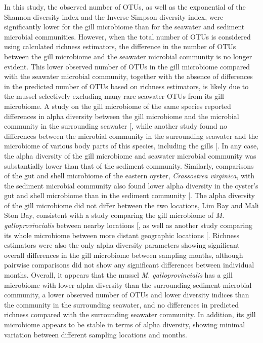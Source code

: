 \documentclass[
  12 pt,
]{article}
\begin{document}
In this study, the observed number of OTUs, as well as the exponential of the Shannon diversity index and the Inverse Simpson diversity index, were significantly lower for the gill microbiome than for the seawater and sediment microbial communities. However, when the total number of OTUs is considered using calculated richness estimators, the difference in the number of OTUs between the gill microbiome and the seawater microbial community is no longer evident. This lower observed number of OTUs in the gill microbiome compared with the seawater microbial community, together with the absence of differences in the predicted number of OTUs based on richness estimators, is likely due to the mussel selectively excluding many rare seawater OTUs from its gill microbiome. A study on the gill microbiome of the same species reported differences in alpha diversity between the gill microbiome and the microbial community in the surrounding seawater {[}\citeproc{ref-Zardinoni2024}{31}{]}, while another study found no differences between the microbial community in the surrounding seawater and the microbiome of various body parts of this species, including the gills {[}\citeproc{ref-Musella2020}{14}{]}. In any case, the alpha diversity of the gill microbiome and seawater microbial community was substantially lower than that of the sediment community. Similarly, comparisons of the gut and shell microbiome of the eastern oyster, \emph{Crassostrea virginica}, with the sediment microbial community also found lower alpha diversity in the oyster's gut and shell microbiome than in the sediment community {[}\citeproc{ref-Arfken2017}{12}{]}. The alpha diversity of the gill microbiome did not differ between the two locations, Lim Bay and Mali Ston Bay, consistent with a study comparing the gill microbiome of \emph{M. galloprovincialis} between nearby locations {[}\citeproc{ref-Zardinoni2024}{31}{]}, as well as another study comparing its whole microbiome between more distant geographic locations {[}\citeproc{ref-Peruzzo2026}{23}{]}. Richness estimators were also the only alpha diversity parameters showing significant overall differences in the gill microbiome between sampling months, although pairwise comparisons did not show any significant differences between individual months. Overall, it appears that the mussel \emph{M. galloprovincialis} has a gill microbiome with lower alpha diversity than the surrounding sediment microbial community, a lower observed number of OTUs and lower diversity indices than the community in the surrounding seawater, and no differences in predicted richness compared with the surrounding seawater community. In addition, its gill microbiome appears to be stable in terms of alpha diversity, showing minimal variation between different sampling locations and months.
\end{document}
